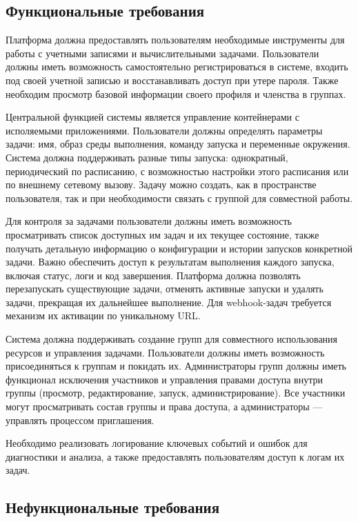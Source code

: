 \subsection{Функциональные требования}

Платформа должна предоставлять пользователям необходимые инструменты для работы с учетными записями и вычислительными задачами. Пользователи должны иметь возможность самостоятельно регистрироваться в системе, входить под своей учетной записью и восстанавливать доступ при утере пароля. Также необходим просмотр базовой информации своего профиля и членства в группах.

Центральной функцией системы является управление контейнерами с исполяемыми приложениями.
Пользователи должны определять параметры задачи: имя, образ среды выполнения, команду запуска и переменные окружения.
Система должна поддерживать разные типы запуска: однократный, периодический по расписанию, с возможностью настройки этого расписания или по внешнему сетевому вызову.
Задачу можно создать, как в пространстве пользователя, так и при необходимости связать с группой для совместной работы.

Для контроля за задачами пользователи должны иметь возможность просматривать список доступных им задач и их текущее состояние, также получать детальную информацию о конфигурации и истории запусков конкретной задачи.
Важно обеспечить доступ к результатам выполнения каждого запуска, включая статус, логи и код завершения.
Платформа должна позволять перезапускать существующие задачи, отменять активные запуски и удалять задачи, прекращая их дальнейшее выполнение.
Для webhook-задач требуется механизм их активации по уникальному URL.

Система должна поддерживать создание групп для совместного использования ресурсов и управления задачами.
Пользователи должны иметь возможность присоединяться к группам и покидать их.
Администраторы групп должны иметь функционал исключения участников и управления правами доступа внутри группы (просмотр, редактирование, запуск, администрирование).
Все участники могут просматривать состав группы и права доступа, а администраторы — управлять процессом приглашения.

Необходимо реализовать логирование ключевых событий и ошибок для диагностики и анализа, а также предоставлять пользователям доступ к логам их задач.

\subsection{Нефункциональные требования}

